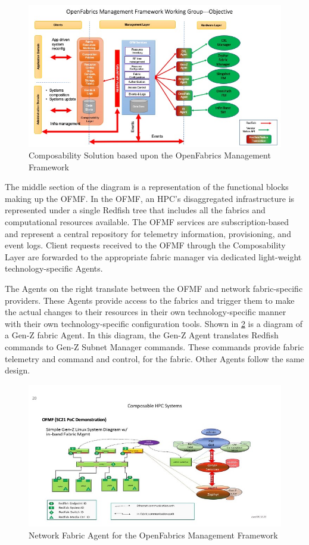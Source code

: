 \begin{figure}[ComposableSolution]
  \centerline{\includegraphics[width=\columnwidth]{Slide19.jpeg}}
  \caption{Composability Solution based upon the OpenFabrics Management Framework}
  \label{fig:ofmf}
\end{figure}

The middle section of the diagram is a representation of the functional blocks making up the OFMF.  In the OFMF, an HPC's disaggregated infrastructure is represented under a single Redfish tree that includes all the fabrics and computational resources available. The OFMF services are subscription-based and represent a central repository for telemetry information, provisioning, and event logs.  Client requests received to the OFMF through the Composability Layer are forwarded to the appropriate fabric manager via dedicated light-weight technology-specific Agents. 

The Agents on the right translate between the OFMF and network fabric-specific providers.  These Agents provide access to the fabrics and trigger them to make the actual changes to their resources in their own technology-specific manner with their own technology-specific configuration tools.  Shown in \ref{fig:agent} is a diagram of a Gen-Z fabric Agent.  In this diagram, the Gen-Z Agent translates Redfish commands to Gen-Z Subnet Manager commands.  These commands provide fabric telemetry and command and control, for the fabric.  Other Agents follow the same design.

\begin{figure}[Hardware Agent]
  \centerline{\includegraphics[width=\columnwidth]{Slide20.jpeg}}
  \caption{Network Fabric Agent for the OpenFabrics Management Framework}
  \label{fig:agent}
\end{figure}



